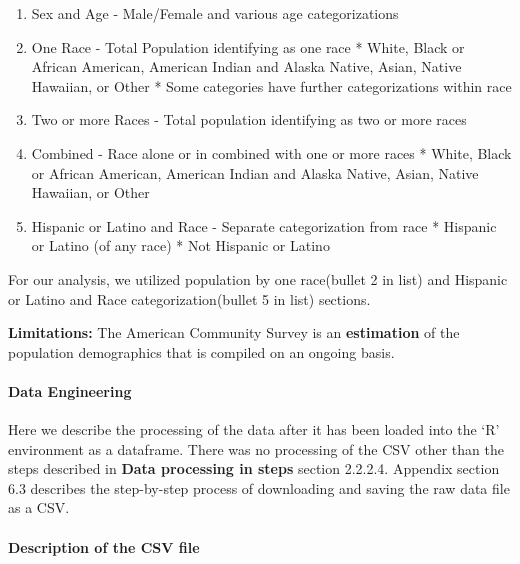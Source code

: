 \documentclass[
]{article}
\providecommand{\tightlist}{%
  \setlength{\itemsep}{0pt}\setlength{\parskip}{0pt}}
\begin{document}
\begin{enumerate}
\def\labelenumi{\arabic{enumi}.}
\tightlist
\item
  Sex and Age - Male/Female and various age categorizations
\item
  One Race - Total Population identifying as one race * White, Black or
  African American, American Indian and Alaska Native, Asian, Native
  Hawaiian, or Other * Some categories have further categorizations
  within race
\item
  Two or more Races - Total population identifying as two or more races
\item
  Combined - Race alone or in combined with one or more races * White,
  Black or African American, American Indian and Alaska Native, Asian,
  Native Hawaiian, or Other
\item
  Hispanic or Latino and Race - Separate categorization from race *
  Hispanic or Latino (of any race) * Not Hispanic or Latino
\end{enumerate}

For our analysis, we utilized population by one race(bullet 2 in list)
and Hispanic or Latino and Race categorization(bullet 5 in list)
sections.

\textbf{Limitations: } The American Community Survey is an
\textbf{estimation} of the population demographics that is compiled on
an ongoing basis.

\hypertarget{data-engineering-1}{%
\paragraph{\texorpdfstring{Data Engineering\\
}{Data Engineering }}\label{data-engineering-1}}

Here we describe the processing of the data after it has been loaded
into the `R' environment as a dataframe. There was no processing of the
CSV other than the steps described in \textbf{Data processing in steps}
section 2.2.2.4. Appendix section 6.3 describes the step-by-step process
of downloading and saving the raw data file as a CSV.

\hypertarget{description-of-the-csv-file}{%
\paragraph{Description of the CSV
file}\label{description-of-the-csv-file}}
\end{document}
